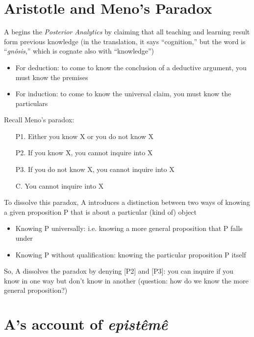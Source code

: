 \documentclass[oneside]{article}
\begin{document}
\thispagestyle{fancy}



\section*{Aristotle and Meno's Paradox}

\noindent A begins the \emph{Posterior Analytics} by claiming that all teaching and learning result form previous knowledge (in the translation, it says ``cognition,'' but the word is ``\emph{gn\^{o}sis},'' which is cognate also with ``knowledge'')

\begin{itemize}\item{For deduction: to come to know the conclusion of a deductive argument, you must know the premises}\item{For induction: to come to know the universal claim, you must know the particulars}\end{itemize}

\noindent Recall Meno's paradox: 

\begin{itemize}
\item[P1.] Either you know X or you do not know X
\item[P2.] If you know X, you cannot inquire into X
\item[P3.] If you do not know X, you cannot inquire into X
\item[C.] You cannot inquire into X
\end{itemize}

\noindent To dissolve this paradox, A introduces a distinction between two ways of knowing a given proposition P that is about a particular (kind of) object

\begin{itemize}\item{Knowing P universally: i.e. knowing a more general proposition that P falls under}\item{Knowing P without qualification: knowing the particular proposition P itself}\end{itemize}
\vspace*{2mm}

\noindent So, A dissolves the paradox by denying [P2] and [P3]: you can inquire if you know in one way but don't know in another (question: how do we know the more general proposition?)

\section*{A's account of \emph{epist\^{e}m\^{e}}}
\end{document}
